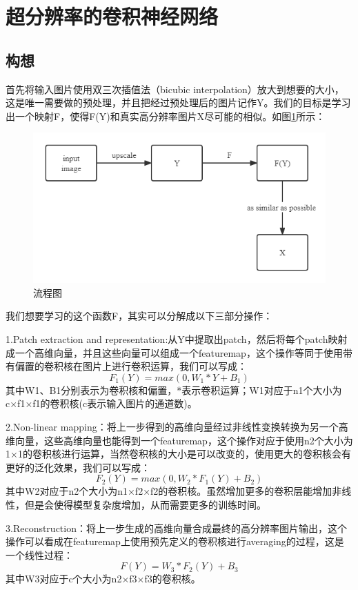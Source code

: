 \documentclass[UTF8,a4paper,10pt]{ctexrep}
\begin{document}
\section{超分辨率的卷积神经网络}

\subsection{构想}
首先将输入图片使用双三次插值法（bicubic interpolation）放大到想要的大小，这是唯一需要做的预处理，并且把经过预处理后的图片记作Y。我们的目标是学习出一个映射F，使得F(Y)和真实高分辨率图片X尽可能的相似。如图\ref{fig:p1}所示：


\begin{figure}[H]
  \centering
  \includegraphics[scale=0.5]{figure/p1.png}
  \caption{流程图}
  \label{fig:p1}
\end{figure}

我们想要学习的这个函数F，其实可以分解成以下三部分操作：


1.Patch extraction and representation:从Y中提取出patch，然后将每个patch映射成一个高维向量，并且这些向量可以组成一个featuremap，这个操作等同于使用带有偏置的卷积核在图片上进行卷积运算，我们可以写成：
$$F_1(Y)=max(0,W_1\ast Y+B_1)$$
其中W1、B1分别表示为卷积核和偏置，*表示卷积运算；W1对应于n1个大小为c×f1×f1的卷积核(c表示输入图片的通道数)。

2.Non-linear mapping：将上一步得到的高维向量经过非线性变换转换为另一个高维向量，这些高维向量也能得到一个featuremap，这个操作对应于使用n2个大小为1×1的卷积核进行运算，当然卷积核的大小是可以改变的，使用更大的卷积核会有更好的泛化效果，我们可以写成：
$$F_2(Y)=max(0,W_2\ast F_1(Y)+B_2)$$
其中W2对应于n2个大小为n1×f2×f2的卷积核。虽然增加更多的卷积层能增加非线性，但是会使得模型复杂度增加，从而需要更多的训练时间。

3.Reconstruction：将上一步生成的高维向量合成最终的高分辨率图片输出，这个操作可以看成在featuremap上使用预先定义的卷积核进行averaging的过程，这是一个线性过程：
$$F(Y)=W_3\ast F_2(Y)+B_3$$
其中W3对应于c个大小为n2×f3×f3的卷积核。
\end{document}
